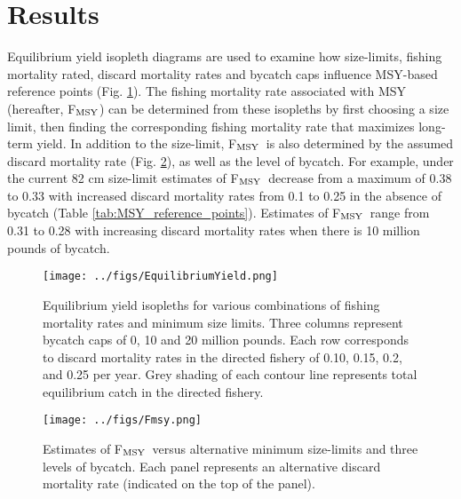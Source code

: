 \documentclass[12pt,leqno]{article}
\newcommand{\fmsy}{F$_{\textnormal{MSY}}$}
\begin{document}
\section*{Results}

Equilibrium yield isopleth diagrams are used to examine how size-limits, fishing mortality rated, discard mortality rates and bycatch caps influence MSY-based reference points (Fig. \ref{fig:EquilibriumYield}).  The fishing mortality rate associated with MSY (hereafter, \fmsy) can be determined from these isopleths by first choosing a size limit, then finding the corresponding fishing mortality rate that maximizes long-term yield.  In addition to the size-limit, \fmsy\ is also  determined by the assumed discard mortality rate (Fig. \ref{fig:Fmsy}), as well as the level of bycatch.  For example, under the current 82 cm size-limit estimates of \fmsy\ decrease from a maximum of 0.38 to 0.33 with increased discard mortality rates from 0.1 to 0.25 in the absence of bycatch (Table \ref{tab:MSY_reference_points}). Estimates of \fmsy\ range from 0.31 to 0.28 with increasing discard mortality rates when there is 10 million pounds of bycatch. 

\begin{figure}
	\texttt{[image: ../figs/EquilibriumYield.png]}
	\caption{Equilibrium yield isopleths for various combinations of fishing mortality rates and minimum size limits. Three columns represent bycatch caps of 0, 10 and 20 million pounds. Each row corresponds to discard mortality rates in the directed fishery of 0.10, 0.15, 0.2, and 0.25 per year.  Grey shading of each contour line represents total equilibrium catch in the directed fishery. }\label{fig:EquilibriumYield}
\end{figure}

\begin{figure}
	\texttt{[image: ../figs/Fmsy.png]}
	\caption{Estimates of \fmsy\ versus alternative minimum size-limits and three levels of bycatch. Each panel represents an alternative discard mortality rate (indicated on the top of the panel).}\label{fig:Fmsy}
\end{figure}
\end{document}
